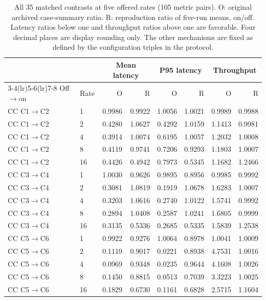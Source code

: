 \clearpage
\begin{table}[p]
\centering\small
\caption{All 35 matched contrasts at five offered rates (105 metric pairs). O: original archived case-summary ratio. R: reproduction ratio of five-run means, on/off. Latency ratios below one and throughput ratios above one are favorable. Four decimal places are display rounding only. The other mechanisms are fixed as defined by the configuration triples in the protocol.}
\label{tab:s2-reproduction-ratios}
\setlength{\tabcolsep}{4pt}
\renewcommand{\arraystretch}{1.10}
\begin{tabular*}{\linewidth}{@{\extracolsep{\fill}}llrrrrrr@{}}
\toprule
 & & \multicolumn{2}{c}{Mean latency} & \multicolumn{2}{c}{P95 latency} & \multicolumn{2}{c}{Throughput}\\
\cmidrule(lr){3-4}\cmidrule(lr){5-6}\cmidrule(lr){7-8}
Off$\to$on & Rate & O & R & O & R & O & R\\
\midrule
CC C1$\to$C2 & 1 & 0.9986 & 0.9922 & 1.0056 & 1.0021 & 0.9989 & 0.9988\\
CC C1$\to$C2 & 2 & 0.4280 & 1.0627 & 0.4292 & 1.0159 & 1.1413 & 0.9981\\
CC C1$\to$C2 & 4 & 0.3914 & 1.0074 & 0.6195 & 1.0057 & 1.2032 & 1.0008\\
CC C1$\to$C2 & 8 & 0.4119 & 0.9741 & 0.7206 & 0.9293 & 1.1803 & 1.0007\\
CC C1$\to$C2 & 16 & 0.4426 & 0.4942 & 0.7973 & 0.5345 & 1.1682 & 1.2466\\
\midrule
CC C3$\to$C4 & 1 & 1.0030 & 0.9626 & 0.9895 & 0.8956 & 0.9985 & 0.9992\\
CC C3$\to$C4 & 2 & 0.3081 & 1.0819 & 0.1919 & 1.0678 & 1.6283 & 1.0007\\
CC C3$\to$C4 & 4 & 0.3203 & 1.0616 & 0.2740 & 1.0122 & 1.5741 & 0.9992\\
CC C3$\to$C4 & 8 & 0.2894 & 1.0408 & 0.2587 & 1.0241 & 1.6805 & 0.9999\\
CC C3$\to$C4 & 16 & 0.3135 & 0.5336 & 0.2685 & 0.5335 & 1.5839 & 1.2538\\
\midrule
CC C5$\to$C6 & 1 & 0.9922 & 0.9276 & 1.0064 & 0.8978 & 1.0041 & 1.0009\\
CC C5$\to$C6 & 2 & 0.1119 & 0.9017 & 0.0221 & 0.8938 & 4.7531 & 1.0016\\
CC C5$\to$C6 & 4 & 0.0969 & 0.9348 & 0.0235 & 0.9644 & 4.1608 & 1.0026\\
CC C5$\to$C6 & 8 & 0.1450 & 0.8815 & 0.0513 & 0.7039 & 3.3223 & 1.0025\\
CC C5$\to$C6 & 16 & 0.1829 & 0.6730 & 0.1161 & 0.6828 & 2.5715 & 1.1604\\

\end{tabular*}
\end{table}
